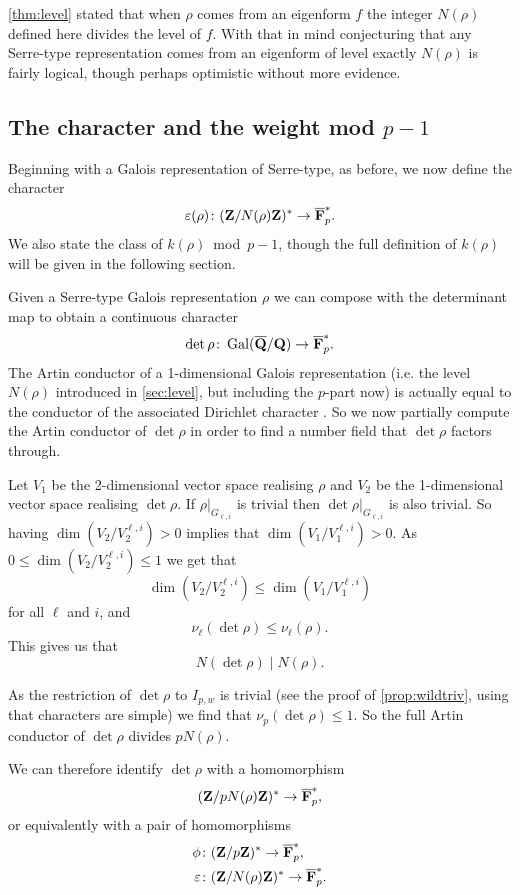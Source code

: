 \documentclass[a4paper,12pt]{article}
\begin{document}
\cref{thm:level} stated that when $\rho$ comes from an eigenform $f$ the integer $N(\rho)$ defined here divides the level of $f$.
With that in mind conjecturing that any Serre-type representation comes from an eigenform of level exactly $N(\rho)$ is fairly logical, though perhaps optimistic without more evidence.


\subsection{The character and the weight mod $p-1$}\label{subsec:char}
Beginning with a Galois representation of Serre-type, as before, we now define the character
\[
\varepsilon(\rho)\colon  (\mathbf{Z}/N(\rho)\mathbf{Z})^* \to \overline{\mathbf{F}}_p^*.
\]
We also state the class of $k(\rho)$~mod~$p-1$, though the full definition of $k(\rho)$ will be given in the following section.

Given a Serre-type Galois representation $\rho$ we can compose with the determinant map to obtain a continuous character
\[
\det \rho\colon \operatorname{Gal}(\overline{\mathbf{Q}}/\mathbf{Q}) \to \overline{\mathbf{F}}_p^*.
\]
The Artin conductor of a 1-dimensional Galois representation (i.e. the level $N(\rho)$ introduced in \cref{sec:level}, but including the $p$-part now) is actually equal to the conductor of the associated Dirichlet character \cite[p. 228]{SerreLF}.
So we now partially compute the Artin conductor of $\det\rho$ in order to find a number field that $\det\rho$ factors through.

Let $V_1$ be the 2-dimensional vector space realising $\rho$ and $V_2$ be the 1-dimensional vector space realising $\det\rho$.
If $\rho|_{G_{\ell,i}}$ is trivial then $\det\rho|_{G_{\ell, i}}$ is also trivial.
So having $\dim(V_2/V_2^{\ell,i}) > 0$ implies that $\dim(V_1/V_1^{\ell,i}) > 0$.
As $0 \le \dim(V_2/V_2^{\ell,i}) \le 1$ we get that
\[
\dim(V_2/V_2^{\ell,i})\le \dim(V_1/V_1^{\ell,i})
\]
for all $\ell$ and $i$, and %
\[
\nu_\ell(\det\rho) \le \nu_\ell(\rho).
\]
This gives us that
\[
N(\det\rho) \mid N(\rho).
\]

As the restriction of $\det\rho$ to $I_{p,w}$ is trivial (see the proof of \cref{prop:wildtriv}, using that characters are simple) we find that $\nu_p(\det\rho)\le 1$.
So the full Artin conductor of $\det\rho$ divides $pN(\rho)$.

We can therefore identify $\det\rho$ with a homomorphism
\[
(\mathbf{Z}/pN(\rho)\mathbf{Z})^* \to \overline{\mathbf{F}}_p^*,
\]
or equivalently with a pair of homomorphisms
\begin{align*}
\phi\colon& (\mathbf{Z}/p\mathbf{Z})^* \to \overline{\mathbf{F}}_p^*,\\
\varepsilon\colon& (\mathbf{Z}/N(\rho)\mathbf{Z})^* \to \overline{\mathbf{F}}_p^*.
\end{align*}
\end{document}
